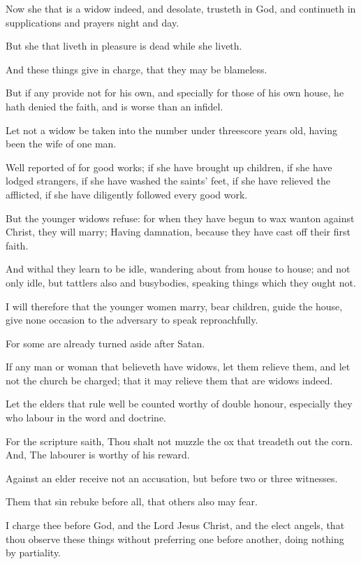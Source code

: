 \verse Now she that is a widow indeed, and desolate, trusteth in God, and continueth in supplications and prayers night and day.

\verse But she that liveth in pleasure is dead while she liveth.

\verse And these things give in charge, that they may be blameless.

\verse But if any provide not for his own, and specially for those of his own house, he hath denied the faith, and is worse than an infidel.

\verse Let not a widow be taken into the number under threescore years old, having been the wife of one man.

\verse Well reported of for good works; if she have brought up children, if she have lodged strangers, if she have washed the saints' feet, if she have relieved the afflicted, if she have diligently followed every good work.

\verse But the younger widows refuse: for when they have begun to wax wanton against Christ, they will marry; \verse Having damnation, because they have cast off their first faith.

\verse And withal they learn to be idle, wandering about from house to house; and not only idle, but tattlers also and busybodies, speaking things which they ought not.

\verse I will therefore that the younger women marry, bear children, guide the house, give none occasion to the adversary to speak reproachfully.

\verse For some are already turned aside after Satan.

\verse If any man or woman that believeth have widows, let them relieve them, and let not the church be charged; that it may relieve them that are widows indeed.

\verse Let the elders that rule well be counted worthy of double honour, especially they who labour in the word and doctrine.

\verse For the scripture saith, Thou shalt not muzzle the ox that treadeth out the corn. And, The labourer is worthy of his reward.

\verse Against an elder receive not an accusation, but before two or three witnesses.

\verse Them that sin rebuke before all, that others also may fear.

\verse I charge thee before God, and the Lord Jesus Christ, and the elect angels, that thou observe these things without preferring one before another, doing nothing by partiality.

